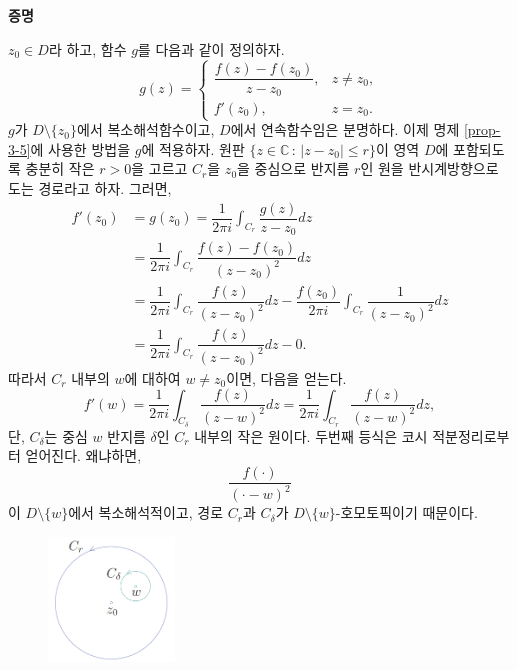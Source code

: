 {\bf 증명}

$z_0\in D$라 하고,
함수 $g$를 다음과 같이 정의하자.
\[
g(z) = \begin{cases}
\dfrac{f(z)-f(z_0)}{z-z_0}, & z\ne z_0, \\
f'(z_0), & z=z_0.
\end{cases}
\]
$g$가 $D\setminus \{z_0\}$에서 복소해석함수이고, 
$D$에서 연속함수임은 분명하다.
이제 명제 \ref{prop-3-5}에 사용한 방법을 $g$에 적용하자.
원판 $\{z\in\mathbb C\,:\, |z-z_0| \le r\}$이
영역 $D$에 포함되도록 충분히 작은 $r>0$을 고르고
$C_r$을 $z_0$을 중심으로 반지름 $r$인 원을 반시계방향으로 도는 경로라고 하자.
그러면,
\begin{align}
f'(z_0) &= g(z_0)
= \dfrac1{2\pi i} \int_{C_r} \dfrac{g(z)}{z - z_0} dz \nonumber \\
&= \dfrac1{2\pi i} \int_{C_r} \dfrac{f(z)-f(z_0)}{(z-z_0)^2} dz \\
&= \dfrac1{2\pi i} \int_{C_r} \dfrac{f(z)}{(z-z_0)^2} dz
- \dfrac{f(z_0)}{2\pi i} \int_{C_r} \dfrac{1}{(z-z_0)^2} dz \nonumber \\
&= \dfrac1{2\pi i} \int_{C_r} \dfrac{f(z)}{(z-z_0)^2} dz - 0. \label{eq-3-5}
\end{align}
따라서 $C_r$ 내부의 $w$에 대하여 $w\ne z_0$이면, 다음을 얻는다.
\[
f'(w) = \dfrac1{2\pi i}\int_{C_\delta} \dfrac{f(z)}{(z-w)^2}dz
= \dfrac1{2\pi i}\int_{C_r} \dfrac{f(z)}{(z-w)^2}dz,
\]
단, $C_\delta$는  중심 $w$ 반지름 $\delta$인 $C_r$ 내부의 작은 원이다. 
두번째 등식은 코시 적분정리로부터 얻어진다. 왜냐하면,
\[
\dfrac{f(\cdot)}{(\cdot - w)^2}
\]
이 $D\setminus \{w\}$에서 복소해석적이고, 경로 $C_r$과 $C_\delta$가
$D\setminus \{w\}$-호모토픽이기 때문이다.

\begin{figure}[h!]
\begin{center}
\includegraphics[width=0.3\textwidth]{./SaltChapter/figs/fig-3-0-11}
\end{center}
\end{figure}

